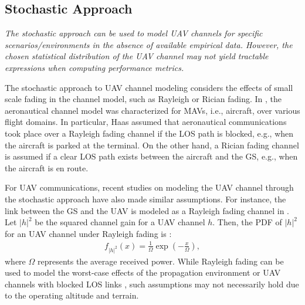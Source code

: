 \subsection{Stochastic Approach} \label{lit_review_stochastic_approach}

\begin{summary} \emph{
\emph{The stochastic approach can be used to model UAV channels for specific scenarios/environments in the absence of available empirical data. However, the chosen statistical distribution of the UAV channel may not yield tractable expressions when computing performance metrics.}
}
\end{summary}

The stochastic approach to UAV channel modeling considers the effects of small scale fading in the channel model, such as Rayleigh or Rician fading. In \cite{haas2002aeronautical}, the aeronautical channel model was characterized for MAVs, i.e., aircraft, over various flight domains. In particular, Haas \cite{haas2002aeronautical} assumed that aeronautical communications took place over a Rayleigh fading channel if the LOS path is blocked, e.g., when the aircraft is parked at the terminal. On the other hand, a Rician fading channel is assumed if a clear LOS path exists between the aircraft and the GS, e.g., when the aircraft is en route. 

For UAV communications, recent studies on modeling the UAV channel through the stochastic approach have also made similar assumptions. For instance, the link between the GS and the UAV is modeled as a Rayleigh fading channel in \cite{hayajneh2018performance,li2017optimal,lyu2017spectrum}. Let $|h|^2$ be the squared channel gain for a UAV channel $h$. Then, the PDF of $|h|^2$ for an UAV channel under Rayleigh fading is \cite[Table I]{rached2017unified}:
\begin{eqnarray} \label{lit_review_rayleigh_pdf}
f_{|h|^2}(x) = \frac{1}{\Omega}\exp\left(-\frac{x}{\Omega}\right),
\end{eqnarray}
where $\Omega$ represents the average received power. While Rayleigh fading can be used to model the worst-case effects of the propagation environment \cite{hayajneh2018performance} or UAV channels with blocked LOS links \cite{li2017optimal}, such assumptions may not necessarily hold due to the operating altitude and terrain. 

